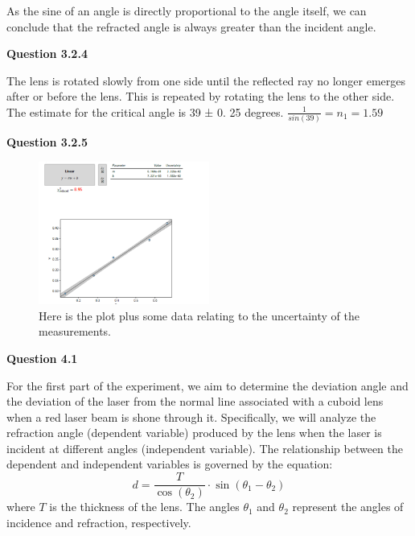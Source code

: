 \documentclass[a4paper,12pt]{article}
\begin{document}
\vspace{0.1cm}

As the sine of an angle is directly proportional to the angle itself, we can conclude that the refracted angle is always greater than the incident angle.

\vspace{0.2cm}

\noindent \textbf{\LARGE Question 3.2.4}

\vspace{0.2cm}

The lens is rotated slowly from one side until the reflected ray no longer emerges after or
before the lens. This is repeated by rotating the lens to the other side. The estimate for the
critical angle is 39 ± 0. 25 degrees. $\frac{1}{sin(39)} = n_1 = 1.59$

\vspace{5cm}

\noindent \textbf{\LARGE Question 3.2.5}

\begin{figure}[htbp]
    \centering
    \includegraphics[width=0.5\textwidth]{fourth_diagram_lab1_PHY_192.png}
    \caption{Here is the plot plus some data relating to the uncertainty of the measurements.} 
\end{figure}

\noindent \textbf{\LARGE Question 4.1}

\vspace{0.5cm}

For the first part of the experiment, we aim to determine the deviation angle and the 
deviation of the laser from the normal line associated with a cuboid lens when a red laser beam 
is shone through it. Specifically, we will analyze the refraction angle (dependent variable) 
produced by the lens when the laser is incident at different angles (independent variable). 
The relationship between the dependent and independent variables is governed by the equation:
\[
d = \frac{T}{\cos(\theta_2)} \cdot \sin(\theta_1 - \theta_2)
\]
where $T$ is the thickness of the lens. The angles $\theta_1$ and $\theta_2$ represent the angles of incidence 
and refraction, respectively.
\end{document}
